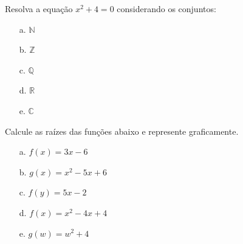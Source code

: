 \begin{exercise}
	Resolva a equação $x^2+4=0$ considerando os conjuntos:
	\begin{itemize}
		\item[a.]{$\mathbb{N}$}
		\item[b.]{$\mathbb{Z}$}
		\item[c.]{$\mathbb{Q}$}
		\item[d.]{$\mathbb{R}$}
		\item[e.]{$\mathbb{C}$}
	\end{itemize}
\end{exercise}

\begin{exercise}
	Calcule as raízes das funções abaixo e represente graficamente.
	\begin{itemize}
		\item[a.]{$f(x) = 3x - 6$}
		\item[b.]{$g(x) = x^2-5x+6$}
		\item[c.]{$f(y) = 5x - 2$}
		\item[d.]{$f(x) = x^2-4x+4$}
		\item[e.]{$g(w) = w^2+4$}
	\end{itemize}
\end{exercise}